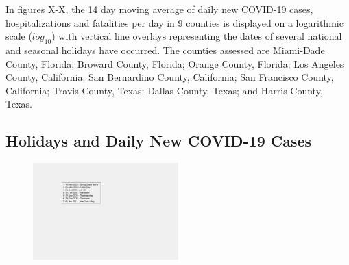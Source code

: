 \documentclass[]{article}
\begin{document}
\indent In figures X-X, the 14 day moving average of daily new COVID-19 cases, hospitalizations and fatalities per day in 9 counties is displayed on a logarithmic scale ($log_{10}$) with vertical line overlays representing the dates of several national and seasonal holidays have occurred. The counties assessed are Miami-Dade County, Florida; Broward County, Florida; Orange County, Florida; Los Angeles County, California; San Bernardino County, California; San Francisco County, California; Travis County, Texas; Dallas County, Texas; and Harris County, Texas.

\subsection{Holidays and Daily New COVID-19 Cases}

\begin{figure}[!h]
	\centering
	\includegraphics[width=0.50\textwidth]{legends/holiday_legend.png}
	\caption{}
	\label{fig:legends/holiday_legendLabel}
\end{figure}
\end{document}
